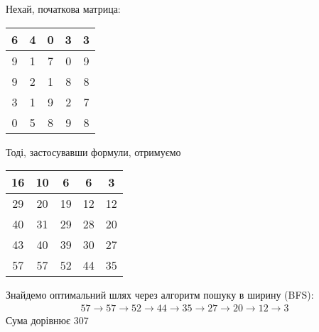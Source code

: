 Нехай, початкова матрица: \\
\begin{tabular}{|c|c|c|c|c|}
      \hline
      6 & 4 & 0 & 3 & 3 \\
      \hline
      9 & 1 & 7 & 0 & 9 \\
      \hline
      9 & 2 & 1 & 8 & 8 \\
      \hline
      3 & 1 & 9 & 2 & 7 \\
      \hline
      0 & 5 & 8 & 9 & 8 \\
      \hline
\end{tabular}

Тоді, застосувавши формули, отримуємо \\
\begin{tabular}{|c|c|c|c|c|}
      \hline
      16 & 10 & 6  & 6  & 3  \\
      \hline
      29 & 20 & 19 & 12 & 12 \\
      \hline
      40 & 31 & 29 & 28 & 20 \\
      \hline
      43 & 40 & 39 & 30 & 27 \\
      \hline
      57 & 57 & 52 & 44 & 35 \\
      \hline
\end{tabular}

Знайдемо оптимальний шлях через
алгоритм пошуку в ширину (BFS): \\
\begin{align}
      57 \rightarrow
      57 \rightarrow
      52 \rightarrow
      44 \rightarrow
      35 \rightarrow
      27 \rightarrow
      20 \rightarrow
      12 \rightarrow
      3
\end{align}
Сума дорівнює 307
